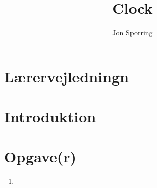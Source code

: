 \documentclass[a4paper,12pt]{article}
\title{Clock}
\author{Jon Sporring}
\begin{document}
\maketitle

\section{Lærervejledningn}

\section{Introduktion}

\section{Opgave(r)}
\begin{enumerate}
\item 
\end{enumerate}
\end{document}
